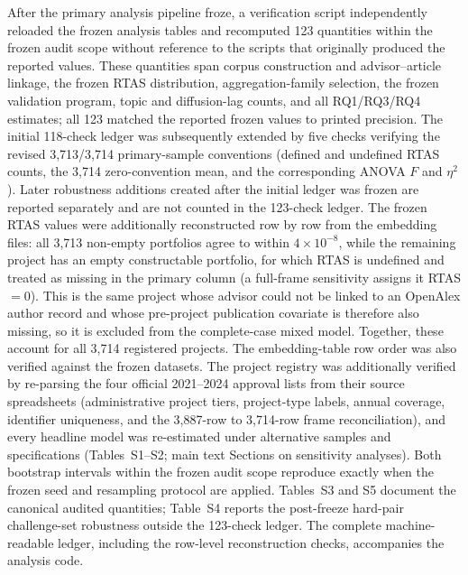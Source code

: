 \documentclass[a4paper,11pt]{article}
\begin{document}
After the primary analysis pipeline froze, a verification script independently reloaded the frozen analysis tables and recomputed 123 quantities within the frozen audit scope without reference to the scripts that originally produced the reported values. These quantities span corpus construction and advisor--article linkage, the frozen RTAS distribution, aggregation-family selection, the frozen validation program, topic and diffusion-lag counts, and all RQ1/RQ3/RQ4 estimates; all 123 matched the reported frozen values to printed precision. The initial 118-check ledger was subsequently extended by five checks verifying the revised 3,713/3,714 primary-sample conventions (defined and undefined RTAS counts, the 3,714 zero-convention mean, and the corresponding ANOVA $F$ and $\eta^2$). Later robustness additions created after the initial ledger was frozen are reported separately and are not counted in the 123-check ledger. The frozen RTAS values were additionally reconstructed row by row from the embedding files: all 3,713 non-empty portfolios agree to within $4\times10^{-8}$, while the remaining project has an empty constructable portfolio, for which RTAS is undefined and treated as missing in the primary column (a full-frame sensitivity assigns it RTAS $=0$). This is the same project whose advisor could not be linked to an OpenAlex author record and whose pre-project publication covariate is therefore also missing, so it is excluded from the complete-case mixed model. Together, these account for all 3,714 registered projects. The embedding-table row order was also verified against the frozen datasets. The project registry was additionally verified by re-parsing the four official 2021--2024 approval lists from their source spreadsheets (administrative project tiers, project-type labels, annual coverage, identifier uniqueness, and the 3,887-row to 3,714-row frame reconciliation), and every headline model was re-estimated under alternative samples and specifications (Tables~S1--S2; main text Sections on sensitivity analyses). Both bootstrap intervals within the frozen audit scope reproduce exactly when the frozen seed and resampling protocol are applied. Tables~S3 and S5 document the canonical audited quantities; Table~S4 reports the post-freeze hard-pair challenge-set robustness outside the 123-check ledger. The complete machine-readable ledger, including the row-level reconstruction checks, accompanies the analysis code.

\end{document}

